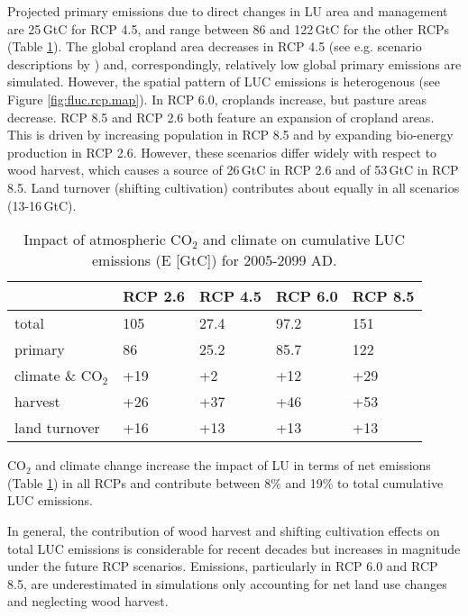 Projected primary emissions due to direct changes in LU area and management are 25\,GtC for RCP 4.5, and range between 86 and 122\,GtC for the other RCPs (Table \ref{tab:rcp}). The global cropland area decreases in RCP 4.5 (see e.g. scenario descriptions by \citet{riahi11cc, vanvuuren11cc}) and, correspondingly, relatively low global primary emissions are simulated. However, the spatial pattern of LUC emissions is heterogenous (see Figure \ref{fig:fluc.rcp.map}). In RCP 6.0, croplands increase, but pasture areas decrease. RCP 8.5 and RCP 2.6 both feature an expansion of cropland areas. This is driven by increasing population in RCP 8.5 and by expanding bio-energy production in RCP 2.6. However, these scenarios differ widely with respect to wood harvest, which causes a source of 26\,GtC in RCP 2.6 and of 53\,GtC in RCP 8.5. Land turnover (shifting cultivation) contributes about equally in all scenarios (13-16\,GtC).
\begin{table}
 \caption[Impact of atmospheric CO$_2$ and climate on cumulative LUC emissions  for 2005-2099 AD]{Impact of atmospheric CO$_2$ and climate on cumulative LUC emissions (E [GtC]) for 2005-2099 AD.}
 \centering
 \small\sffamily
 \begin{tabular}{l l l l l}
  \hline
   &			RCP 2.6 &	RCP 4.5 &	RCP 6.0 &	RCP 8.5 \\
  \hline
  total&                    105 &          27.4 &          97.2 &            151\\
  primary&                   86 &          25.2 &          85.7 &            122\\
  \hline
  climate \& CO$_2$&       +19 &        +2 &         +12 &             +29\\
  \hline
  harvest&                 +26 &        +37 &         +46 &             +53\\
  land turnover &            +16 &        +13 &         +13 &             +13\\
  \hline
 \end{tabular}
  \label{tab:rcp}
\end{table}

CO$_2$ and climate change increase the impact of LU in terms of net emissions (Table \ref{tab:rcp}) in all RCPs and contribute between 8\% and 19\% to total cumulative LUC emissions.

In general, the contribution of wood harvest and shifting cultivation effects on total LUC emissions is considerable for recent decades but increases in magnitude under the future RCP scenarios. Emissions, particularly in RCP 6.0 and RCP 8.5, are underestimated in simulations only accounting for net land use changes and neglecting wood harvest.

